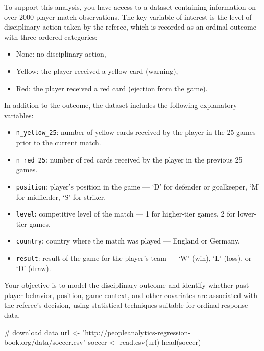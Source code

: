 \documentclass[
  letterpaper,
  DIV=11,
  numbers=noendperiod]{scrartcl}
\newenvironment{Shaded}{\begin{snugshade}}{\end{snugshade}}
\newcommand{\CommentTok}[1]{\textcolor[rgb]{0.37,0.37,0.37}{#1}}
\newcommand{\FunctionTok}[1]{\textcolor[rgb]{0.28,0.35,0.67}{#1}}
\newcommand{\NormalTok}[1]{\textcolor[rgb]{0.00,0.23,0.31}{#1}}
\newcommand{\OtherTok}[1]{\textcolor[rgb]{0.00,0.23,0.31}{#1}}
\newcommand{\StringTok}[1]{\textcolor[rgb]{0.13,0.47,0.30}{#1}}
\begin{document}
To support this analysis, you have access to a dataset containing
information on over 2000 player-match observations. The key variable of
interest is the level of disciplinary action taken by the referee, which
is recorded as an ordinal outcome with three ordered categories:

\begin{itemize}
\item
  None: no disciplinary action,
\item
  Yellow: the player received a yellow card (warning),
\item
  Red: the player received a red card (ejection from the game).
\end{itemize}

In addition to the outcome, the dataset includes the following
explanatory variables:

\begin{itemize}
\item
  \texttt{n\_yellow\_25}: number of yellow cards received by the player
  in the 25 games prior to the current match.
\item
  \texttt{n\_red\_25}: number of red cards received by the player in the
  previous 25 games.
\item
  \texttt{position}: player's position in the game --- `D' for defender
  or goalkeeper, `M' for midfielder, `S' for striker.
\item
  \texttt{level}: competitive level of the match --- 1 for higher-tier
  games, 2 for lower-tier games.
\item
  \texttt{country}: country where the match was played --- England or
  Germany.
\item
  \texttt{result}: result of the game for the player's team --- `W'
  (win), `L' (loss), or `D' (draw).
\end{itemize}

Your objective is to model the disciplinary outcome and identify whether
past player behavior, position, game context, and other covariates are
associated with the referee's decision, using statistical techniques
suitable for ordinal response data.

\begin{Shaded}
\begin{Highlighting}[]
\CommentTok{\# download data}
\NormalTok{url }\OtherTok{\textless{}{-}} \StringTok{"http://peopleanalytics{-}regression{-}book.org/data/soccer.csv"}
\NormalTok{soccer }\OtherTok{\textless{}{-}} \FunctionTok{read.csv}\NormalTok{(url)}
\FunctionTok{head}\NormalTok{(soccer)}
\end{Highlighting}
\end{Shaded}
\end{document}
